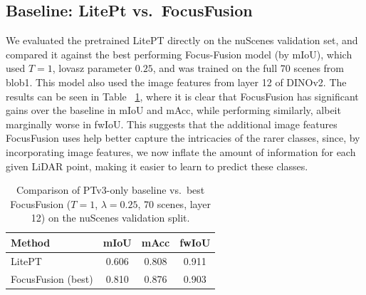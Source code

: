 \documentclass[10pt,twocolumn,letterpaper]{article}
\begin{document}

\subsection{Baseline: LitePt vs.\ FocusFusion}
We evaluated the pretrained LitePT directly on the nuScenes validation set, and compared it against the best performing Focus-Fusion model (by mIoU), which used $T=1$, lovasz parameter $0.25$, and was trained on the full 70 scenes from blob1. This model also used the image features from layer 12 of DINOv2. The results can be seen in Table ~\ref{tab:baseline}, where it is clear that FocusFusion has significant gains over the baseline in mIoU and mAcc, while performing similarly, albeit marginally worse in fwIoU. This suggests that the additional image features FocusFusion uses help better capture the intricacies of the rarer classes, since, by incorporating image features, we now inflate the amount of information for each given LiDAR point, making it easier to learn to predict these classes.

\begin{table}
\begin{center}
\begin{tabular}{|l|c|c|c|}
\hline
Method & mIoU & mAcc & fwIoU \\
\hline\hline
LitePT & 0.606 & 0.808 & 0.911 \\
FocusFusion (best) & 0.810 & 0.876 & 0.903 \\
\hline
\end{tabular}
\end{center}
\caption{Comparison of PTv3-only baseline vs.\ best FocusFusion ($T=1$, $\lambda=0.25$, 70 scenes, layer 12) on the nuScenes validation split.}
\label{tab:baseline}
\end{table}
\end{document}
